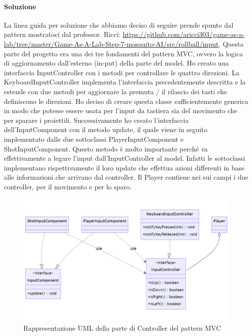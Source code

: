 \documentclass[a4paper,12pt]{report}
\begin{document}
\paragraph{Soluzione} La linea guida per soluzione che abbiamo deciso di seguire prende spunto dal pattern mostratoci dal professor. Ricci: \url{https://github.com/aricci303/game-as-a-lab/tree/master/Game-As-A-Lab-Step-7-mosquito-AI/src/rollball/input}. Questa parte del progetto era una dei tre fondamenti del pattern MVC, ovvero la logica di aggiornamento dall'esterno (in-put) della parte del model. Ho creato una interfaccia InputController con i metodi per controllare le quattro direzioni. La KeyboardInputController implementa l'interfaccia precedentemente descritta e la estende con due metodi per aggiornare la premuta / il rilascio dei tasti che definiscono le direzioni. Ho deciso di creare questa classe sufficientemente generica in modo che potesse essere usata per l'input da tastiera sia del movimento che per sparare i proiettili. Successivamente ho creato l'interfaccia dell'InputComponent con il metodo update, il quale viene in seguito implementato dalle due sottoclassi PlayerInputComponent e ShotInputComponent. Questo metodo è molto importante perché va effettivamente a legare l'input dall'InputController al model. Infatti le sottoclassi implementano rispettivamente il loro update che effettua azioni differenti in base alle informazioni che arrivano dal controller. Il Player contiene nei sui campi i due controller, per il movimento e per lo sparo.
\begin{figure}[H]
    \centering{}
    \includegraphics[scale=0.4]{diagram/InputComponent.png}
    \caption{Rappresentazione UML della parte di Controller del pattern MVC}
    \label{img:InputComponent}
\end{figure}
\end{document}
